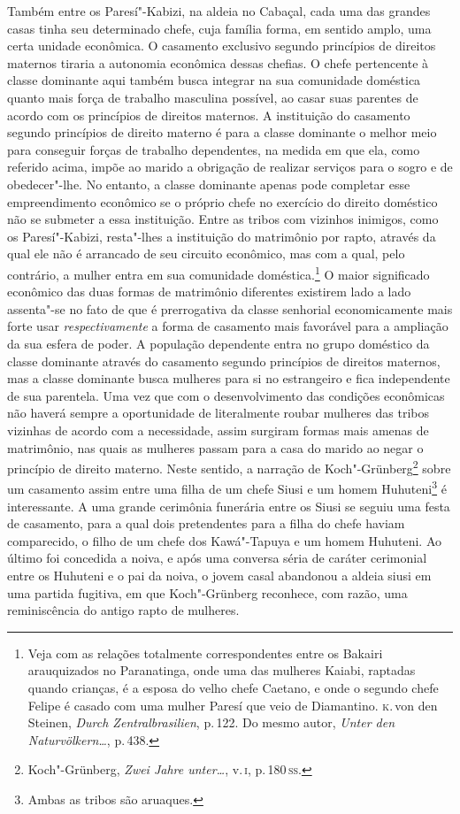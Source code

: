 Também entre os Paresí"-Kabizi, na
aldeia no Cabaçal, cada uma das grandes casas tinha seu determinado
chefe, cuja família forma, em sentido amplo, uma certa unidade
econômica. O casamento exclusivo segundo princípios de direitos maternos
tiraria a autonomia econômica dessas chefias. O chefe pertencente à
classe dominante aqui também busca integrar na sua comunidade doméstica
quanto mais força de trabalho masculina possível, ao casar suas
parentes de acordo com os princípios de direitos maternos. A
instituição do casamento segundo princípios de direito materno é para a
classe dominante o melhor meio para conseguir forças de trabalho
dependentes, na medida em que ela, como referido acima, impõe ao marido
a obrigação de realizar serviços para o sogro e de obedecer"-lhe. No entanto, 
a classe dominante apenas pode completar esse empreendimento
econômico se o próprio chefe no exercício do direito doméstico não se
submeter a essa instituição. Entre as tribos com vizinhos inimigos, como
os Paresí"-Kabizi, resta"-lhes a instituição do matrimônio por rapto,
através da qual ele não é arrancado de seu circuito econômico, mas com a
qual, pelo contrário, a mulher entra em sua comunidade
doméstica.\footnote{Veja com as relações totalmente correspondentes entre
  os Bakairi arauquizados no Paranatinga, onde uma das mulheres Kaiabi,
  raptadas quando crianças, é a esposa do velho chefe Caetano, e onde o
  segundo chefe Felipe é casado com uma mulher Paresí que veio de
  Diamantino. \textsc{k}.\,von den Steinen, \textit{Durch Zentralbrasilien}, p.\,122.
  Do mesmo autor, \textit{Unter den Naturvölkern\ldots}, p.\,438.} 
  O maior significado econômico das duas formas de matrimônio
diferentes existirem lado a lado assenta"-se no fato de que é prerrogativa da
classe senhorial economicamente mais forte usar \textit{respectivamente} a forma
de casamento mais favorável para a ampliação da sua esfera de poder. A
população dependente entra no grupo doméstico da classe dominante
através do casamento segundo princípios de direitos maternos, mas a
classe dominante busca mulheres para si no estrangeiro e fica
independente de sua parentela. Uma vez que com o desenvolvimento das
condições econômicas não haverá sempre a oportunidade de
literalmente roubar mulheres das tribos vizinhas de acordo com a
necessidade, assim surgiram formas mais amenas de matrimônio, nas
quais as mulheres passam para a casa do marido ao negar o princípio de
direito materno. Neste sentido, a narração de Koch"-Grünberg\footnote{Koch"-Grünberg,
  \textit{Zwei Jahre unter\ldots}, v.\,\textsc{i}, p.\,180\,\textsc{ss}.}
sobre um casamento assim entre uma filha de um chefe Siusi e um homem
Huhuteni\footnote{Ambas as tribos são aruaques.} é interessante. A uma grande cerimônia
funerária entre os Siusi se seguiu uma festa de casamento, para a qual
dois pretendentes para a filha do chefe haviam comparecido, o filho de
um chefe dos Kawá"-Tapuya e um homem Huhuteni. Ao último foi concedida a
noiva, e após uma conversa séria de caráter cerimonial entre os Huhuteni
e o pai da noiva, o jovem casal abandonou a aldeia siusi em uma partida
fugitiva, em que Koch"-Grünberg reconhece, com razão, uma reminiscência
do antigo rapto de mulheres.


